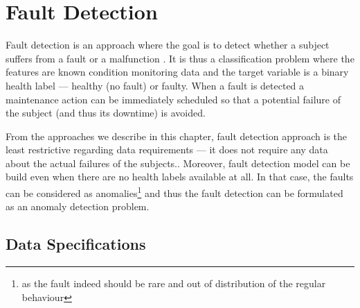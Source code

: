 \section{Fault Detection}
\label{sec:approaches_fd}

Fault detection is an approach where the goal is to detect whether a subject suffers from a fault or a malfunction \cite{jia2018review}.
It is thus a classification problem where the features are known condition monitoring data and the target variable is a binary health label --- healthy (no fault) or faulty.
When a fault is detected a maintenance action can be immediately scheduled so that a potential failure of the subject (and thus its downtime) is avoided.

From the approaches we describe in this chapter, fault detection approach is the least restrictive regarding data requirements --- it does not require any data about the actual failures of the subjects..
Moreover, fault detection model can be build even when there are no health labels available at all.
In that case, the faults can be considered as anomalies\footnote{as the fault indeed should be rare and out of distribution of the regular behaviour} and thus the fault detection can be formulated as an anomaly detection problem.

\subsection{Data Specifications}
\label{sec:approaches_fault_detection_data}

